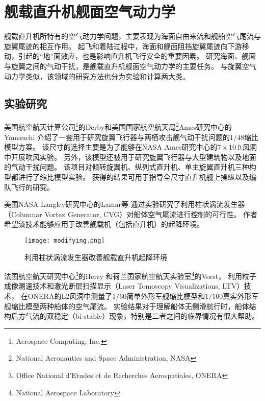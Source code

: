 \documentclass[doctor,openright,twoside,color]{buaathesis}
\begin{document}

\section{舰载直升机舰面空气动力学}
舰载直升机所特有的空气动力学问题，主要表现为海面自由来流和舰船空气尾流与旋翼尾迹的相互作用。
起飞和着陆过程中，海面和舰面阻挡旋翼尾迹向下游移动，引起的“地”面效应，也是影响直升机飞行安全的重要因素。
研究海面、舰面与旋翼之间的气动干扰，是舰载直升机舰面空气动力学的主要任务。
与旋翼空气动力学类似，该领域的研究方法也分为实验和计算两大类。

\subsection{实验研究}
美国航空航天计算公司\footnote{Aerospace Computing, Inc.}的Derby和美国国家航空航天局\footnote{National Aeronautics and Space Administration, NASA}Ames研究中心的Yamauchi
介绍了一套用于研究旋翼飞行器与两栖攻击舰气动干扰问题的$1/48$缩比模型方案。
该尺寸的选择主要是为了能够在NASA Ames研究中心的$7\times10~\mathrm{ft}$风洞中开展吹风实验。
另外，该模型还被用于研究旋翼飞行器与大型建筑物以及地面的气动干扰问题。
该项目对倾转旋翼机、纵列式直升机、单主旋翼直升机三种构型都进行了缩比模型实验。
获得的结果可用于指导全尺寸直升机舰上操纵以及编队飞行的研究。

美国NASA Langley研究中心的Lamar等
通过实验研究了利用柱状涡流发生器（Columnar Vortex Generator, CVG）对船体空气尾流进行控制的可行性。
作者希望该技术能够应用于改善舰载机（包括直升机）的起降环境。
\begin{figure}[t!]
    \centering
    \texttt{[image: modifying.png]}
    \caption{利用柱状涡流发生器改善舰载直升机起降环境}
\end{figure}

法国航空航天研究中心\footnote{Office National d'Etudes et de Recherches Aerospatiales, ONERA}的Herry
和荷兰国家航空航天实验室\footnote{National Aerospace Laboratory}的Vorst，
利用粒子成像测速技术和激光断层扫描显示（Laser Tomoscopy Visualizations, LTV）技术，
在ONERA的L2风洞中测量了$1/60$简单外形军舰缩比模型和$1/100$真实外形军舰缩比模型两种船体的空气尾流。
实验结果对于理解船体无侧滑航行时，船体结构后方气流的双稳定（bi-stable）现象，特别是二者之间的临界情况有很大帮助。
\end{document}
